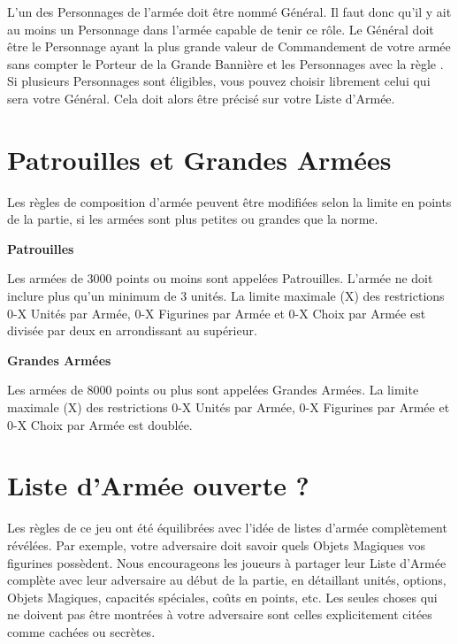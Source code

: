 L'un des Personnages de l'armée doit être nommé Général. Il faut donc qu'il y ait au moins un Personnage dans l'armée capable de tenir ce rôle. Le Général doit être le Personnage ayant la plus grande valeur de Commandement de votre armée sans compter le Porteur de la Grande Bannière et les Personnages avec la règle \notaleader{}. Si plusieurs Personnages sont éligibles, vous pouvez choisir librement celui qui sera votre Général. Cela doit alors être précisé sur votre Liste d'Armée.

\section{Patrouilles et Grandes Armées}

Les règles de composition d'armée peuvent être modifiées selon la limite en points de la partie, si les armées sont plus petites ou grandes que la norme.

\begin{multicols}{2}\raggedcolumns

\begin{center}\textbf{Patrouilles}\end{center}

Les armées de 3000 points ou moins sont appelées Patrouilles. L'armée ne doit inclure plus qu'un minimum de 3 unités. La limite maximale (X) des restrictions 0-X Unités par Armée, 0-X Figurines par Armée et 0-X Choix par Armée est divisée par deux en arrondissant au supérieur.

\columnbreak

\begin{center}\textbf{Grandes Armées}\end{center}

Les armées de 8000 points ou plus sont appelées Grandes Armées. La limite maximale (X) des restrictions 0-X Unités par Armée, 0-X Figurines par Armée et 0-X Choix par Armée est doublée.

\end{multicols}

\newpage
\section{Liste d'Armée ouverte ?}

Les règles de ce jeu ont été équilibrées avec l'idée de listes d'armée complètement révélées. Par exemple, votre adversaire doit savoir quels Objets Magiques vos figurines possèdent. Nous encourageons les joueurs à partager leur Liste d'Armée complète avec leur adversaire au début de la partie, en détaillant unités, options, Objets Magiques, capacités spéciales, coûts en points, etc. Les seules choses qui ne doivent pas être montrées à votre adversaire sont celles explicitement citées comme cachées ou secrètes.

